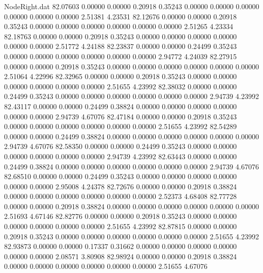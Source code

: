 \begin{filecontents}{NodeRight.dat}
  82.07603    0.00000    0.00000     0.20918    0.35243    0.00000    0.00000    0.00000    0.00000    0.00000    0.00000    2.51381    4.23531
  82.12676    0.00000    0.00000     0.20918    0.35243    0.00000    0.00000    0.00000    0.00000    0.00000    0.00000    2.51265    4.23334
  82.18763    0.00000    0.00000     0.20918    0.35243    0.00000    0.00000    0.00000    0.00000    0.00000    0.00000    2.51772    4.24188
  82.23837    0.00000    0.00000     0.24499    0.35243    0.00000    0.00000    0.00000    0.00000    0.00000    0.00000    2.94772    4.24039
  82.27915    0.00000    0.00000     0.20918    0.35243    0.00000    0.00000    0.00000    0.00000    0.00000    0.00000    2.51064    4.22996
  82.32965    0.00000    0.00000     0.20918    0.35243    0.00000    0.00000    0.00000    0.00000    0.00000    0.00000    2.51655    4.23992
  82.38032    0.00000    0.00000     0.24499    0.35243    0.00000    0.00000    0.00000    0.00000    0.00000    0.00000    2.94739    4.23992
  82.43117    0.00000    0.00000     0.24499    0.38824    0.00000    0.00000    0.00000    0.00000    0.00000    0.00000    2.94739    4.67076
  82.47184    0.00000    0.00000     0.20918    0.35243    0.00000    0.00000    0.00000    0.00000    0.00000    0.00000    2.51655    4.23992
  82.54289    0.00000    0.00000     0.24499    0.38824    0.00000    0.00000    0.00000    0.00000    0.00000    0.00000    2.94739    4.67076
  82.58350    0.00000    0.00000     0.24499    0.35243    0.00000    0.00000    0.00000    0.00000    0.00000    0.00000    2.94739    4.23992
  82.63443    0.00000    0.00000     0.24499    0.38824    0.00000    0.00000    0.00000    0.00000    0.00000    0.00000    2.94739    4.67076
  82.68510    0.00000    0.00000     0.24499    0.35243    0.00000    0.00000    0.00000    0.00000    0.00000    0.00000    2.95008    4.24378
  82.72676    0.00000    0.00000     0.20918    0.38824    0.00000    0.00000    0.00000    0.00000    0.00000    0.00000    2.52373    4.68408
  82.77728    0.00000    0.00000     0.20918    0.38824    0.00000    0.00000    0.00000    0.00000    0.00000    0.00000    2.51693    4.67146
  82.82776    0.00000    0.00000     0.20918    0.35243    0.00000    0.00000    0.00000    0.00000    0.00000    0.00000    2.51655    4.23992
  82.87815    0.00000    0.00000     0.20918    0.35243    0.00000    0.00000    0.00000    0.00000    0.00000    0.00000    2.51655    4.23992
  82.93873    0.00000    0.00000     0.17337    0.31662    0.00000    0.00000    0.00000    0.00000    0.00000    0.00000    2.08571    3.80908
  82.98924    0.00000    0.00000     0.20918    0.38824    0.00000    0.00000    0.00000    0.00000    0.00000    0.00000    2.51655    4.67076

\end{filecontents}
